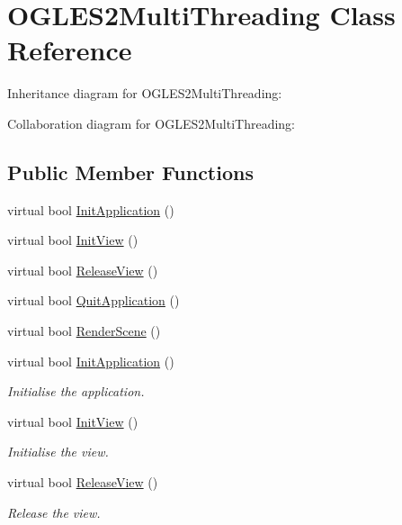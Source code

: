 \hypertarget{class_o_g_l_e_s2_multi_threading}{\section{O\+G\+L\+E\+S2\+Multi\+Threading Class Reference}
\label{class_o_g_l_e_s2_multi_threading}
}


Inheritance diagram for O\+G\+L\+E\+S2\+Multi\+Threading\+:


Collaboration diagram for O\+G\+L\+E\+S2\+Multi\+Threading\+:
\subsection*{Public Member Functions}
\begin{DoxyCompactItemize}
\item 
virtual bool \hyperlink{class_o_g_l_e_s2_multi_threading_af0177bde1ff0ec05a774fd76b6d2d979}{Init\+Application} ()
\item 
virtual bool \hyperlink{class_o_g_l_e_s2_multi_threading_acbd0bc65afff1abdcbe55d0fef90418c}{Init\+View} ()
\item 
virtual bool \hyperlink{class_o_g_l_e_s2_multi_threading_aa072e571d42b26547f371f27a4eb888b}{Release\+View} ()
\item 
virtual bool \hyperlink{class_o_g_l_e_s2_multi_threading_ab7beb59575219f7ed55dd4c8987fb486}{Quit\+Application} ()
\item 
virtual bool \hyperlink{class_o_g_l_e_s2_multi_threading_ae87249846557310b53349bf2456d9ba6}{Render\+Scene} ()
\item 
virtual bool \hyperlink{class_o_g_l_e_s2_multi_threading_a82784f463dfad0c1b1fd9aee2e09b8d2}{Init\+Application} ()
\begin{DoxyCompactList}\small\item\em Initialise the application. \end{DoxyCompactList}\item 
virtual bool \hyperlink{class_o_g_l_e_s2_multi_threading_a61ca9534a1dd41dde71efb6e1b9b6f11}{Init\+View} ()
\begin{DoxyCompactList}\small\item\em Initialise the view. \end{DoxyCompactList}\item 
virtual bool \hyperlink{class_o_g_l_e_s2_multi_threading_aa3c366dc284f730e2343e8a9cb32f90a}{Release\+View} ()
\begin{DoxyCompactList}\small\item\em Release the view. \end{DoxyCompactList}\item 

\end{DoxyCompactItemize}
